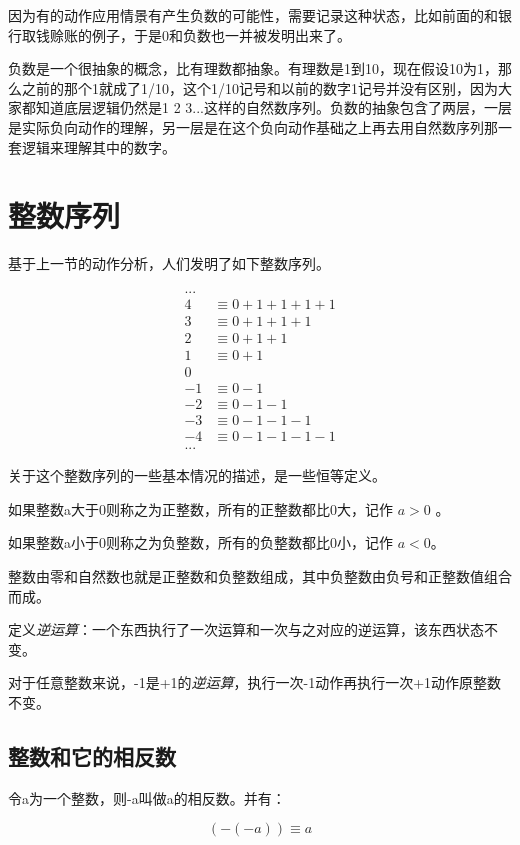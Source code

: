 \documentclass[12pt,oneside]{book}
\begin{document}
因为有的动作应用情景有产生负数的可能性，需要记录这种状态，比如前面的和银行取钱赊账的例子，于是0和负数也一并被发明出来了。

负数是一个很抽象的概念，比有理数都抽象。有理数是1到10，现在假设10为1，那么之前的那个1就成了1/10，这个1/10记号和以前的数字1记号并没有区别，因为大家都知道底层逻辑仍然是1 2 3...这样的自然数序列。负数的抽象包含了两层，一层是实际负向动作的理解，另一层是在这个负向动作基础之上再去用自然数序列那一套逻辑来理解其中的数字。



\section{整数序列}
基于上一节的动作分析，人们发明了如下整数序列。

\begin{align*}
...\\
4 &\equiv 0 + 1 + 1 + 1 +1 \\
3 &\equiv 0 + 1 + 1 +1 \\
2 &\equiv 0 + 1 +1 \\
1 &\equiv 0 + 1 \\
0\\
-1 &\equiv 0 - 1 \\
-2 &\equiv 0 - 1 -1\\
-3 &\equiv 0 - 1 - 1 -1 \\
-4 &\equiv 0 - 1 - 1 - 1 -1\\
...
\end{align*}

关于这个整数序列的一些基本情况的描述，是一些恒等定义。

如果整数a大于0则称之为正整数，所有的正整数都比0大，记作 $a>0$ 。

如果整数a小于0则称之为负整数，所有的负整数都比0小，记作 $a<0$。

整数由零和自然数也就是正整数和负整数组成，其中负整数由负号和正整数值组合而成。

定义\emph{逆运算}：一个东西执行了一次运算和一次与之对应的逆运算，该东西状态不变。

对于任意整数来说，-1是+1的\emph{逆运算}，执行一次-1动作再执行一次+1动作原整数不变。


\subsection{整数和它的相反数}
令a为一个整数，则-a叫做a的相反数。并有： 

\begin{equation}
(-(-a)) \equiv a
\end{equation}
\end{document}

